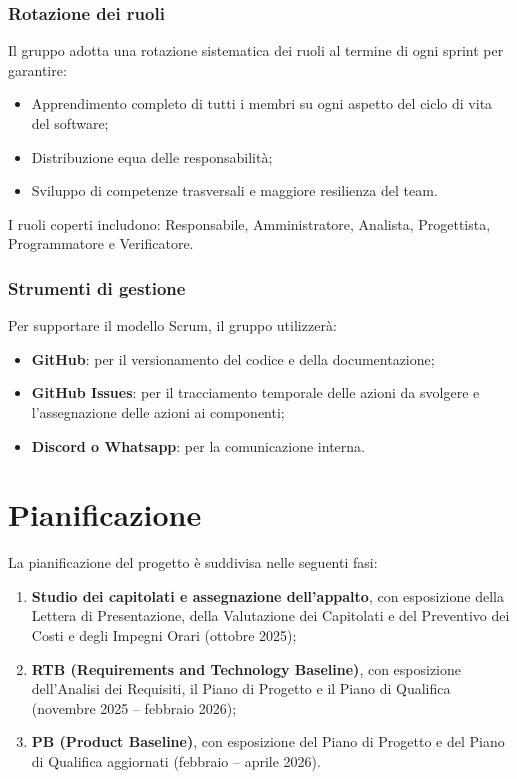 \documentclass[11pt,a4paper]{article}
\begin{document}
\subsubsection{Rotazione dei ruoli}
Il gruppo adotta una rotazione sistematica dei ruoli al termine di ogni sprint per garantire:
\begin{itemize}
    \item Apprendimento completo di tutti i membri su ogni aspetto del ciclo di vita del software;
    \item Distribuzione equa delle responsabilità;
    \item Sviluppo di competenze trasversali e maggiore resilienza del team.
\end{itemize}
I ruoli coperti includono: Responsabile, Amministratore, Analista, Progettista, Programmatore e Verificatore.

\subsubsection{Strumenti di gestione}
Per supportare il modello Scrum, il gruppo utilizzerà:
\begin{itemize}
    \item \textbf{GitHub}: per il versionamento del codice e della documentazione;
    \item \textbf{GitHub Issues}: per il tracciamento temporale delle azioni da svolgere e l'assegnazione delle azioni ai componenti;
    \item \textbf{Discord o Whatsapp}: per la comunicazione interna.
\end{itemize}

\newpage

\section{Pianificazione}
La pianificazione del progetto è suddivisa nelle seguenti fasi:
\begin{enumerate}
    \item \textbf{Studio dei capitolati e assegnazione dell’appalto}, con esposizione della Lettera di Presentazione, della Valutazione dei Capitolati e del Preventivo dei Costi e degli Impegni Orari (ottobre 2025);
    \item \textbf{RTB (Requirements and Technology Baseline)}, con esposizione dell'Analisi dei Requisiti, il Piano di Progetto e il Piano di Qualifica (novembre 2025 – febbraio 2026);
    \item \textbf{PB (Product Baseline)}, con esposizione del Piano di Progetto e del Piano di Qualifica aggiornati (febbraio – aprile 2026).
\end{enumerate}
\end{document}
